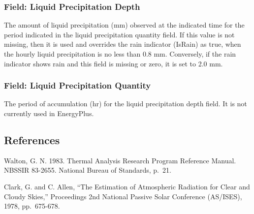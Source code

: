 \subsubsection{Field: Liquid Precipitation Depth}\label{field-liquid-precipitation-depth}

The amount of liquid precipitation (mm) observed at the indicated time for the period indicated in the liquid
precipitation quantity field. If this value is not missing, then it is used and overrides the rain indicator (IsRain) as
true, when the hourly liquid precipitation is no less than 0.8 mm. Conversely, if the rain indicator shows rain and this
field is missing or zero, it is set to 2.0 mm.

\subsubsection{Field: Liquid Precipitation Quantity}\label{field-liquid-precipitation-quantity}

The period of accumulation (hr) for the liquid precipitation depth field. It is not currently used in EnergyPlus.

\subsection{References}\label{references}

Walton, G. N. 1983. Thermal Analysis Research Program Reference Manual. NBSSIR 83-2655. National Bureau of Standards, p.~21.

Clark, G. and C. Allen, ``The Estimation of Atmospheric Radiation for Clear and Cloudy Skies,'' Proceedings 2nd National Passive Solar Conference (AS/ISES), 1978, pp.~675-678.
